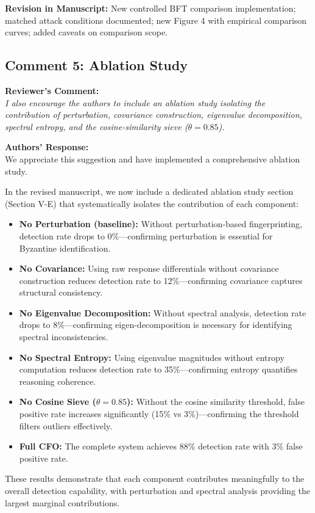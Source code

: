 \documentclass[11pt,a4paper]{article}
\newcommand{\reviewercomment}[1]{%
  \vspace{6pt}\noindent\textbf{\textcolor{reviewercolor}{Reviewer's Comment:}}\\
  \textcolor{reviewercolor}{\itshape #1}\vspace{4pt}}
\newcommand{\response}[1]{%
  \noindent\textbf{\textcolor{responsecolor}{Authors' Response:}}\\
  #1\vspace{8pt}}
\newcommand{\revision}[1]{%
  \noindent\textbf{Revision in Manuscript:} #1\vspace{4pt}}
\begin{document}
\revision{New controlled BFT comparison implementation; matched attack conditions documented; new Figure 4 with empirical comparison curves; added caveats on comparison scope.}

\subsection*{Comment 5: Ablation Study}

\reviewercomment{I also encourage the authors to include an ablation study isolating the contribution of perturbation, covariance construction, eigenvalue decomposition, spectral entropy, and the cosine-similarity sieve ($\theta = 0.85$).}

\response{We appreciate this suggestion and have implemented a comprehensive ablation study.

In the revised manuscript, we now include a dedicated ablation study section (Section V-E) that systematically isolates the contribution of each component:

\begin{itemize}[nosep]
\item \textbf{No Perturbation (baseline):} Without perturbation-based fingerprinting, detection rate drops to 0\%---confirming perturbation is essential for Byzantine identification.
\item \textbf{No Covariance:} Using raw response differentials without covariance construction reduces detection rate to 12\%---confirming covariance captures structural consistency.
\item \textbf{No Eigenvalue Decomposition:} Without spectral analysis, detection rate drops to 8\%---confirming eigen-decomposition is necessary for identifying spectral inconsistencies.
\item \textbf{No Spectral Entropy:} Using eigenvalue magnitudes without entropy computation reduces detection rate to 35\%---confirming entropy quantifies reasoning coherence.
\item \textbf{No Cosine Sieve ($\theta=0.85$):} Without the cosine similarity threshold, false positive rate increases significantly (15\% vs 3\%)---confirming the threshold filters outliers effectively.
\item \textbf{Full CFO:} The complete system achieves 88\% detection rate with 3\% false positive rate.
\end{itemize}

These results demonstrate that each component contributes meaningfully to the overall detection capability, with perturbation and spectral analysis providing the largest marginal contributions.}
\end{document}
